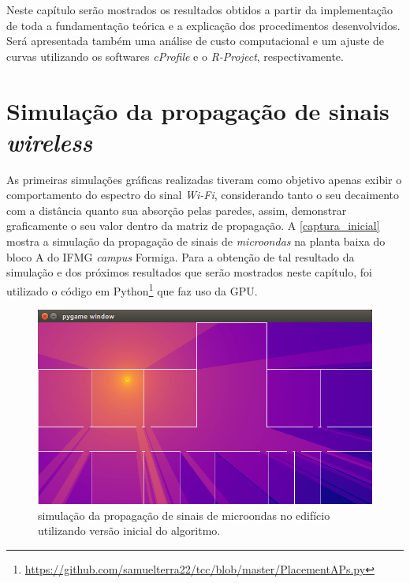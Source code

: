 \documentclass[
	12pt,				%
	openright,			%
	twoside,			%
	a4paper,			%
	english,			%
	french,				%
	spanish,			%
	brazil				%
	]{abntex2}
\begin{document}
Neste capítulo serão mostrados os resultados obtidos a partir da implementação de toda a fundamentação teórica e a explicação dos procedimentos desenvolvidos. Será apresentada também uma análise de custo computacional e um ajuste de curvas utilizando os softwares \textit{cProfile} e o \textit{R-Project}, respectivamente. 

\section[Simulação da propagação de sinais wireless]{Simulação da propagação de sinais \textit{wireless}}

As primeiras simulações gráficas realizadas tiveram como objetivo apenas exibir o comportamento do espectro do sinal \textit{Wi-Fi}, considerando tanto o seu decaimento com a distância quanto sua absorção pelas paredes, assim, demonstrar graficamente o seu valor dentro da matriz de propagação. A \autoref{captura_inicial} mostra a simulação da propagação de sinais de \textit{microondas} na planta baixa do bloco A do IFMG \textit{campus} Formiga. Para a obtenção de tal resultado da simulação e dos próximos resultados que serão mostrados neste capítulo, foi utilizado o código em Python\footnote{\url{https://github.com/samuelterra22/tcc/blob/master/PlacementAPs.py}} que faz uso da GPU.

\begin{figure}[ht]
	\caption{\label{captura_inicial}simulação da propagação de sinais de microondas no edifício utilizando versão inicial do algoritmo.
		}
	\begin{center}
		\includegraphics[scale=0.6]{images/captura-inicial.jpg}
	\end{center}
\end{figure}
\end{document}
